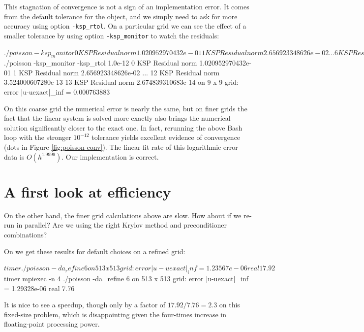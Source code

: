This stagnation of convergence is not a sign of an implementation error.  It comes from the default tolerance for the \pKSP object, and we simply need to ask for more accuracy using option \texttt{-ksp\_rtol}.  On a particular grid we can see the effect of a smaller tolerance by using option \texttt{-ksp\_monitor} to watch the residuals:
\begin{cline}
$ ./poisson -ksp_monitor
  0 KSP Residual norm 1.020952970432e-01 
  1 KSP Residual norm 2.656923348626e-02 
...
  6 KSP Residual norm 2.152764600588e-06 
  7 KSP Residual norm 2.650467236964e-07 
on 9 x 9 grid:  error |u-uexact|_inf = 0.000763959
$ ./poisson -ksp_monitor -ksp_rtol 1.0e-12
  0 KSP Residual norm 1.020952970432e-01 
  1 KSP Residual norm 2.656923348626e-02 
...
 12 KSP Residual norm 3.524000607280e-13 
 13 KSP Residual norm 2.674839310683e-14 
on 9 x 9 grid:  error |u-uexact|_inf = 0.000763883
\end{cline}
On this coarse grid the numerical error is nearly the same, but on finer grids the fact that the linear system is solved more exactly also brings the numerical solution significantly closer to the exact one.  In fact, rerunning the above Bash loop with the stronger $10^{-12}$ tolerance yields excellent evidence of convergence (dots in Figure \ref{fig:poisson-conv}).  The linear-fit rate of this logarithmic error data is $O(h^{1.9999})$.  Our implementation is correct.


\section{A first look at efficiency}

On the other hand, the finer grid calculations above are slow.  How about if we re-run in parallel?  Are we using the right Krylov method and preconditioner combinations?

On \WORKSTATION we get these results for default choices on a refined grid:
\begin{cline}
$ timer ./poisson -da_refine 6 
on 513 x 513 grid:  error |u-uexact|_inf = 1.23567e-06
real 17.92
$ timer mpiexec -n 4 ./poisson -da_refine 6 
on 513 x 513 grid:  error |u-uexact|_inf = 1.29328e-06
real 7.76
\end{cline}
It is nice to see a speedup, though only by a factor of $17.92/7.76 = 2.3$ on this fixed-size problem, which is disappointing given the four-times increase in floating-point processing power.

